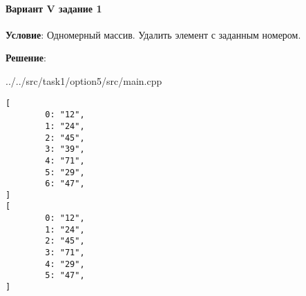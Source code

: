 \paragraph{Вариант V задание 1} \hspace{0pt}

\textbf{Условие}:
Одномерный массив.
Удалить элемент с заданным номером.

\textbf{Решение}:


{../../src/task1/option5/src/main.cpp}

\begin{lstlisting}[language=Out,]
[
        0: "12",
        1: "24",
        2: "45",
        3: "39",
        4: "71",
        5: "29",
        6: "47",
]
[
        0: "12",
        1: "24",
        2: "45",
        3: "71",
        4: "29",
        5: "47",
]
\end{lstlisting}